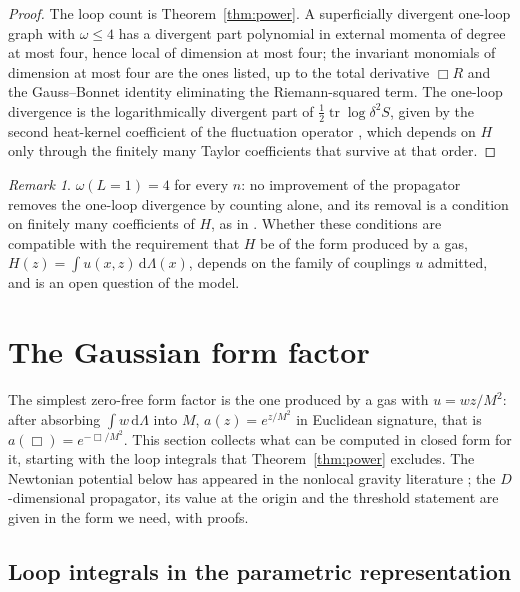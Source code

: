 \documentclass[aps,prd,10pt,twocolumn,superscriptaddress,nofootinbib,floatfix,longbibliography,showpacs,showkeys]{revtex4-2}
\theoremstyle{plain}
\theoremstyle{definition}
\theoremstyle{remark}
\newtheorem{remark}{Remark}
\newcommand{\dd}{\mathrm{d}}
\begin{document}
\begin{proof}
The loop count is Theorem~\ref{thm:power}. A superficially divergent one-loop graph with $\omega\le4$ has a divergent part polynomial in external momenta of degree at most four, hence local of dimension at most four; the invariant monomials of dimension at most four are the ones listed, up to the total derivative $\Box R$ and the Gauss--Bonnet identity eliminating the Riemann-squared term. The one-loop divergence is the logarithmically divergent part of $\tfrac12\operatorname{tr}\log\delta^2S$, given by the second heat-kernel coefficient of the fluctuation operator \cite{Vassilevich2003}, which depends on $H$ only through the finitely many Taylor coefficients that survive at that order.
\end{proof}

\begin{remark}
$\omega(L=1)=4$ for every $n$: no improvement of the propagator removes the one-loop divergence by counting alone, and its removal is a condition on finitely many coefficients of $H$, as in \cite{ModestoRachwal2014}. Whether these conditions are compatible with the requirement that $H$ be of the form produced by a gas, $H(z)=\int u(x,z)\,\dd\Lambda(x)$, depends on the family of couplings $u$ admitted, and is an open question of the model.
\end{remark}

\section{The Gaussian form factor}
\label{sec:gaussian}

The simplest zero-free form factor is the one produced by a gas with $u=wz/M^2$: after absorbing $\int w\,\dd\Lambda$ into $M$, $a(z)=e^{z/M^2}$ in Euclidean signature, that is $a(\Box)=e^{-\Box/M^2}$. This section collects what can be computed in closed form for it, starting with the loop integrals that Theorem~\ref{thm:power} excludes. The Newtonian potential below has appeared in the nonlocal gravity literature \cite{BGKM2012,EdholmKoshelevMazumdar2016,Buoninfante2018}; the $D$-dimensional propagator, its value at the origin and the threshold statement are given in the form we need, with proofs.

\subsection{Loop integrals in the parametric representation}
\end{document}

